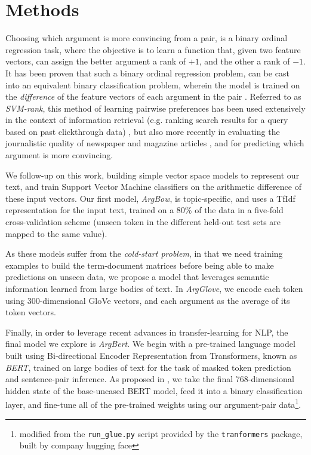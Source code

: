 \documentclass[runningheads]{llncs}
\begin{document}
\section{Methods}
Choosing which argument is more convincing from a pair, is a binary 
ordinal regression task, where the objective is to learn a function that, given 
two feature vectors, can assign the better argument a rank of $+1$, and the 
other a rank of $-1$.   
It has been proven that such a binary ordinal regression problem, can be cast 
into an equivalent binary classification problem, wherein the model is trained 
on the \textit{difference} of the feature vectors of each argument in the pair 
\cite{herbrich_support_1999}. 
Referred to as \textit{SVM-rank}, this method of learning pairwise preferences 
has been used extensively in the context of information retrieval (e.g. ranking 
search results for a query based on past clickthrough data) 
\cite{joachims_optimizing_2002}, but also more recently in evaluating the 
journalistic quality of newspaper and magazine articles \cite{louis_what_2013}, 
and for predicting which argument is more convincing\cite{habernal_which_2016}.

We follow-up on this work, building simple vector space models to represent our 
text, and train Support Vector Machine classifiers on the arithmetic difference 
of these input vectors. Our first model, \textit{ArgBow}, is topic-specific, 
and uses a TfIdf representation for the input text, trained on a 80\% of the 
data in a five-fold cross-validation scheme (unseen token in the different 
held-out test sets are mapped to the same value). 

As these models suffer from the \textit{cold-start problem}, in that we need 
training examples to build the term-document matrices before being able to make 
predictions on unseen data, we propose a model that leverages semantic 
information learned from large bodies of text. In \textit{ArgGlove}, we encode 
each token using 300-dimensional GloVe vectors\cite{pennington_glove:_2014}, 
and each argument as the average of its token vectors. 

Finally, in order to leverage recent advances in transfer-learning for NLP, the 
final model we explore is \textit{ArgBert}. We begin with a pre-trained 
language model built using  Bi-directional Encoder Representation from 
Transformers, known as \textit{BERT}\cite{devlin_bert_2018}, trained on large 
bodies of text for the task of masked token prediction and sentence-pair 
inference. As proposed in \cite{toledo_automatic_2019}, we take the final 
768-dimensional hidden state of the base-uncased BERT model, feed it into 
a binary classification layer, and fine-tune all of the pre-trained weights 
using our argument-pair data\footnote{modified from the \verb|run_glue.py| 
script provided by the \verb|tranformers| package, built by company hugging 
face}.
\end{document}
